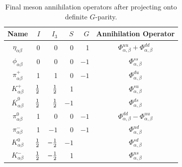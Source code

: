     \begin{table}
        \centering
        \begin{tabular}{|c|r|r|r|r|c|}
            \hline
            Name & $I$ & $I_3$ & $S$ & $G$ & Annihilation Operator \\
            \hline
            $\eta_{\alpha \beta}$ & 0 & 0 & 0 & 1 & $\Phi_{\alpha, \beta}^{uu} + \Phi_{\alpha, \beta}^{dd}$ \\
            $\phi_{\alpha \beta}$ & 0 & 0 & 0 & $-1$ & $\Phi_{\alpha, \beta}^{ss}$ \\
            $\pi^+_{\alpha \beta}$ & 1 & 1 & 0 & $-1$ & $\Phi_{\alpha, \beta}^{du}$ \\
            $K^+_{\alpha \beta}$ & $\frac{1}{2}$ & $\frac{1}{2}$ & 1 & & $\Phi_{\alpha, \beta}^{su}$ \\
            $\overline K^0_{\alpha \beta}$ & $\frac{1}{2}$ & $\frac{1}{2}$ & $-1$ & & $\Phi_{\alpha, \beta}^{ds}$ \\
            $\pi^0_{\alpha \beta}$ & 1 & 0 & 0 & $-1$ & $\Phi_{\alpha, \beta}^{dd} - \Phi_{\alpha, \beta}^{uu}$ \\
            $\pi^-_{\alpha \beta}$ & 1 & $-1$ & 0 & $-1$ & $\Phi_{\alpha, \beta}^{ud}$ \\
            $K^0_{\alpha \beta}$ & $\frac{1}{2}$ & $-\frac{1}{2}$ & $-1$ & & $\Phi_{\alpha, \beta}^{sd}$ \\
            $K^-_{\alpha \beta}$ & $\frac{1}{2}$ & $-\frac{1}{2}$ & 1 & & $\Phi_{\alpha, \beta}^{us}$\\
            \hline
        \end{tabular}
        \caption{Final meson annihilation operators after projecting onto definite $G$-parity.}
        \label{table:meson_flavor}
    \end{table}
    
